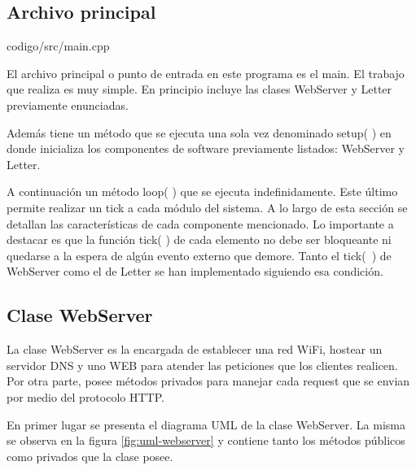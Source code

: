     \subsection{Archivo principal} \label{sec:archivo-principal}
    
                        {codigo/src/main.cpp}
                    
    El archivo principal o punto de entrada en este programa es el main. El trabajo que realiza es muy simple. En principio incluye las clases WebServer y Letter previamente enunciadas.

    Además tiene un método que se ejecuta una sola vez denominado setup( ) en donde inicializa los componentes de software previamente listados: WebServer y Letter. 

    A continuación un método loop( ) que se ejecuta indefinidamente. Este último permite realizar un tick a cada módulo del sistema. A lo largo de esta sección se detallan las características de cada componente mencionado. Lo importante a destacar es que la función tick( ) de cada elemento no debe ser bloqueante ni quedarse a la espera de algún evento externo que demore. Tanto el \mbox{tick( )} de WebServer como el de Letter se han implementado siguiendo esa condición.


    \subsection{Clase WebServer}
    La clase WebServer es la encargada de establecer una red WiFi, hostear un servidor DNS y uno WEB para atender las peticiones que los clientes realicen. Por otra parte, posee métodos privados para manejar cada request que se envian por medio del protocolo HTTP. 

    En primer lugar se presenta el diagrama UML de la clase WebServer. La misma se observa en la figura \ref{fig:uml-webserver} y contiene tanto los métodos públicos como privados que la clase posee.

